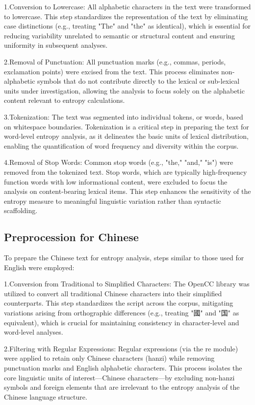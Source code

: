 \documentclass[12pt]{article}
\begin{document}
1.Conversion to Lowercase: All alphabetic characters in the text were transformed to lowercase. This step standardizes the representation of the text by eliminating case distinctions (e.g., treating "The" and "the" as identical), which is essential for reducing variability unrelated to semantic or structural content and ensuring uniformity in subsequent analyses.

2.Removal of Punctuation: All punctuation marks (e.g., commas, periods, exclamation points) were excised from the text. This process eliminates non-alphabetic symbols that do not contribute directly to the lexical or sub-lexical units under investigation, allowing the analysis to focus solely on the alphabetic content relevant to entropy calculations.

3.Tokenization: The text was segmented into individual tokens, or words, based on whitespace boundaries. Tokenization is a critical step in preparing the text for word-level entropy analysis, as it delineates the basic units of lexical distribution, enabling the quantification of word frequency and diversity within the corpus.

4.Removal of Stop Words: Common stop words (e.g., "the," "and," "is") were removed from the tokenized text. Stop words, which are typically high-frequency function words with low informational content, were excluded to focus the analysis on content-bearing lexical items. This step enhances the sensitivity of the entropy measure to meaningful linguistic variation rather than syntactic scaffolding.
\subsection*{\centering Preprocession for Chinese}
To prepare the Chinese text for entropy analysis, steps similar to those used for English were employed:

1.Conversion from Traditional to Simplified Characters: The OpenCC \cite{yang2020} library was utilized to convert all traditional Chinese characters into their simplified counterparts. This step standardizes the script across the corpus, mitigating variations arising from orthographic differences (e.g., treating "國" and "国" as equivalent), which is crucial for maintaining consistency in character-level and word-level analyses.

2.Filtering with Regular Expressions: Regular expressions (via the re module) were applied to retain only Chinese characters (hanzi) while removing punctuation marks and English alphabetic characters. This process isolates the core linguistic units of interest—Chinese characters—by excluding non-hanzi symbols and foreign elements that are irrelevant to the entropy analysis of the Chinese language structure.
\end{document}
